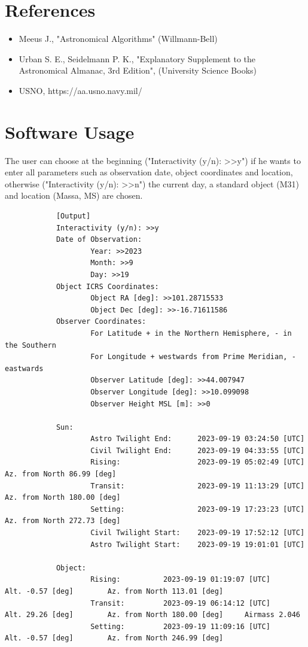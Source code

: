 \documentclass[a4paper]{article}
\begin{document}
	\section{References}
		\begin{itemize}
			\item Meeus J., "Astronomical Algorithms" (Willmann-Bell)
			\item Urban S. E., Seidelmann P. K., "Explanatory Supplement to the Astronomical Almanac, 3rd Edition", (University Science Books)
			\item USNO, https://aa.usno.navy.mil/
		\end{itemize}

	\newpage
	\section{Software Usage}
		The user can choose at the beginning ("Interactivity (y/n): >>y") if he wants to enter all parameters such as observation date, object coordinates and location, otherwise ("Interactivity (y/n): >>n") the current day, a standard object (M31) and location (Massa, MS) are chosen.\\
		
		\begin{scriptsize}
		\begin{verbatim}
			[Output]
			Interactivity (y/n): >>y
			Date of Observation:
			        Year: >>2023
			        Month: >>9
			        Day: >>19
			Object ICRS Coordinates:
			        Object RA [deg]: >>101.28715533
			        Object Dec [deg]: >>-16.71611586
			Observer Coordinates:
			        For Latitude + in the Northern Hemisphere, - in the Southern
			        For Longitude + westwards from Prime Meridian, - eastwards
			        Observer Latitude [deg]: >>44.007947
			        Observer Longitude [deg]: >>10.099098
			        Observer Height MSL [m]: >>0
			
			Sun:
			        Astro Twilight End:      2023-09-19 03:24:50 [UTC]
			        Civil Twilight End:      2023-09-19 04:33:55 [UTC]
			        Rising:                  2023-09-19 05:02:49 [UTC]       Az. from North 86.99 [deg]
			        Transit:                 2023-09-19 11:13:29 [UTC]       Az. from North 180.00 [deg]
			        Setting:                 2023-09-19 17:23:23 [UTC]       Az. from North 272.73 [deg]
			        Civil Twilight Start:    2023-09-19 17:52:12 [UTC]
			        Astro Twilight Start:    2023-09-19 19:01:01 [UTC]
			
			Object:
			        Rising:          2023-09-19 01:19:07 [UTC]       Alt. -0.57 [deg]        Az. from North 113.01 [deg]
			        Transit:         2023-09-19 06:14:12 [UTC]       Alt. 29.26 [deg]        Az. from North 180.00 [deg]     Airmass 2.046
			        Setting:         2023-09-19 11:09:16 [UTC]       Alt. -0.57 [deg]        Az. from North 246.99 [deg]
		\end{verbatim}
		\end{scriptsize}
		
\end{document}
